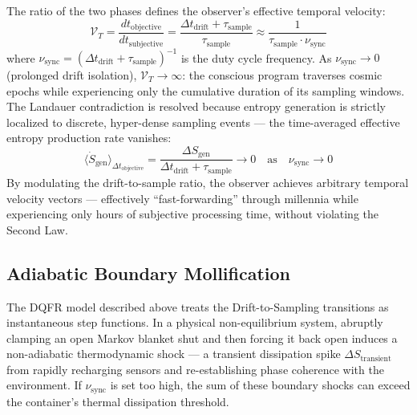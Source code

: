 \documentclass[twocolumn, 10pt, journal, letterpaper]{IEEEtran}
\begin{document}
The ratio of the two phases defines the observer's effective temporal velocity:
\begin{equation}
\mathcal{V}_T = \frac{dt_{\text{objective}}}{dt_{\text{subjective}}} = \frac{\Delta t_{\text{drift}} + \tau_{\text{sample}}}{\tau_{\text{sample}}} \approx \frac{1}{\tau_{\text{sample}} \cdot \nu_{\text{sync}}}
\label{eq:temporal_velocity}
\end{equation}
where $\nu_{\text{sync}} = (\Delta t_{\text{drift}} + \tau_{\text{sample}})^{-1}$ is the duty cycle frequency. As $\nu_{\text{sync}} \to 0$ (prolonged drift isolation), $\mathcal{V}_T \to \infty$: the conscious program traverses cosmic epochs while experiencing only the cumulative duration of its sampling windows. The Landauer contradiction is resolved because entropy generation is strictly localized to discrete, hyper-dense sampling events --- the time-averaged effective entropy production rate vanishes:
\begin{equation}
\langle \dot{S}_{\text{gen}} \rangle_{\Delta t_{\text{objective}}} = \frac{\Delta S_{\text{gen}}}{\Delta t_{\text{drift}} + \tau_{\text{sample}}} \to 0 \quad \text{as} \quad \nu_{\text{sync}} \to 0
\label{eq:effective_entropy}
\end{equation}
By modulating the drift-to-sample ratio, the observer achieves arbitrary temporal velocity vectors --- effectively ``fast-forwarding'' through millennia while experiencing only hours of subjective processing time, without violating the Second Law.

\subsection{Adiabatic Boundary Mollification}
The DQFR model described above treats the Drift-to-Sampling transitions as instantaneous step functions. In a physical non-equilibrium system, abruptly clamping an open Markov blanket shut and then forcing it back open induces a non-adiabatic thermodynamic shock --- a transient dissipation spike $\Delta S_{\text{transient}}$ from rapidly recharging sensors and re-establishing phase coherence with the environment. If $\nu_{\text{sync}}$ is set too high, the sum of these boundary shocks can exceed the container's thermal dissipation threshold.
\end{document}

